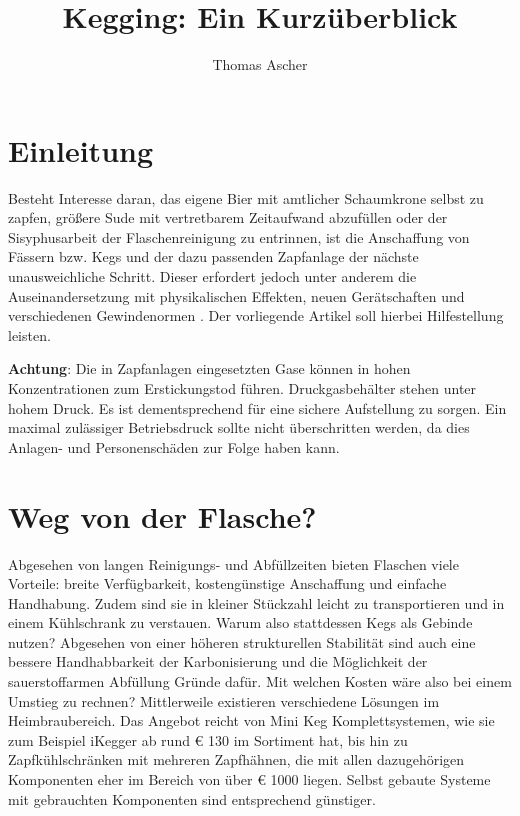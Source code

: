\documentclass[a4paper,parskip=half]{scrartcl}
\title{Kegging: Ein Kurzüberblick}
\author{Thomas Ascher}
\begin{document}
\maketitle

\section*{Einleitung}

Besteht Interesse daran, das eigene Bier mit amtlicher Schaumkrone selbst zu zapfen, größere Sude mit vertretbarem Zeitaufwand abzufüllen oder der Sisyphusarbeit der Flaschenreinigung zu entrinnen, ist die Anschaffung von Fässern bzw. Kegs und der dazu passenden Zapfanlage der nächste unausweichliche Schritt. Dieser erfordert jedoch unter anderem die Auseinandersetzung mit physikalischen Effekten, neuen Gerätschaften und verschiedenen Gewindenormen \autocite{GastroBrennecke2021}. Der vorliegende Artikel soll hierbei Hilfestellung leisten.

\textbf{Achtung}: Die in Zapfanlagen eingesetzten Gase können in hohen Konzentrationen zum Erstickungstod führen. Druckgasbehälter stehen unter hohem Druck. Es ist dementsprechend für eine sichere Aufstellung zu sorgen. Ein maximal zulässiger Betriebsdruck sollte nicht überschritten werden, da dies Anlagen- und Personenschäden zur Folge haben kann.

\section*{Weg von der Flasche?}

Abgesehen von langen Reinigungs- und Abfüllzeiten bieten Flaschen viele Vorteile: breite Verfügbarkeit, kostengünstige Anschaffung und einfache Handhabung. Zudem sind sie in kleiner Stückzahl leicht zu transportieren und in einem Kühlschrank zu verstauen. Warum also stattdessen Kegs als Gebinde nutzen? Abgesehen von einer höheren strukturellen Stabilität sind auch eine bessere Handhabbarkeit der Karbonisierung und die Möglichkeit der sauerstoffarmen Abfüllung Gründe dafür. Mit welchen Kosten wäre also bei einem Umstieg zu
rechnen? Mittlerweile existieren verschiedene Lösungen im Heimbraubereich. Das
Angebot reicht von Mini Keg Komplettsystemen, wie sie zum Beispiel iKegger ab rund
€ 130 im Sortiment hat, bis hin zu Zapfkühlschränken mit mehreren Zapfhähnen,
die mit allen dazugehörigen Komponenten eher im Bereich von über € 1000 liegen.
Selbst gebaute Systeme mit gebrauchten Komponenten sind entsprechend günstiger.
\end{document}

